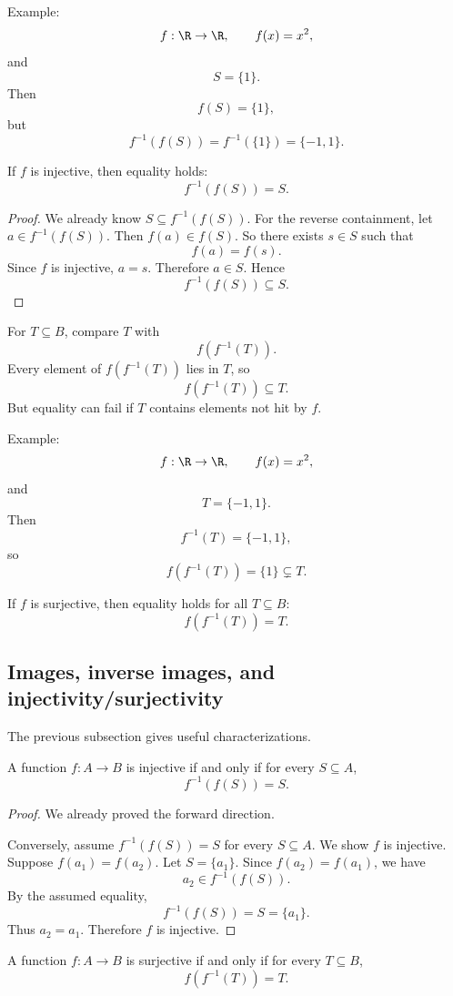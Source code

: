 Example:
\[
f:\R\to\R,\qquad f(x)=x^2,
\]
and
\[
S=\{1\}.
\]
Then
\[
f(S)=\{1\},
\]
but
\[
f^{-1}(f(S))=f^{-1}(\{1\})=\{-1,1\}.
\]

If $f$ is injective, then equality holds:
\[
f^{-1}(f(S))=S.
\]

\begin{proof}
We already know $S\subseteq f^{-1}(f(S))$. For the reverse containment, let $a\in f^{-1}(f(S))$. Then $f(a)\in f(S)$. So there exists $s\in S$ such that
\[
f(a)=f(s).
\]
Since $f$ is injective, $a=s$. Therefore $a\in S$. Hence
\[
f^{-1}(f(S))\subseteq S.
\]
\end{proof}

For $T\subseteq B$, compare $T$ with
\[
f(f^{-1}(T)).
\]
Every element of $f(f^{-1}(T))$ lies in $T$, so
\[
f(f^{-1}(T))\subseteq T.
\]
But equality can fail if $T$ contains elements not hit by $f$.

Example:
\[
f:\R\to\R,\qquad f(x)=x^2,
\]
and
\[
T=\{-1,1\}.
\]
Then
\[
f^{-1}(T)=\{-1,1\},
\]
so
\[
f(f^{-1}(T))=\{1\}\subsetneq T.
\]

If $f$ is surjective, then equality holds for all $T\subseteq B$:
\[
f(f^{-1}(T))=T.
\]

\subsection{Images, inverse images, and injectivity/surjectivity}

The previous subsection gives useful characterizations.

\begin{theorem}
A function $f:A\to B$ is injective if and only if for every $S\subseteq A$,
\[
f^{-1}(f(S))=S.
\]
\end{theorem}

\begin{proof}
We already proved the forward direction.

Conversely, assume $f^{-1}(f(S))=S$ for every $S\subseteq A$. We show $f$ is injective. Suppose $f(a_1)=f(a_2)$. Let $S=\{a_1\}$. Since $f(a_2)=f(a_1)$, we have
\[
a_2\in f^{-1}(f(S)).
\]
By the assumed equality,
\[
f^{-1}(f(S))=S=\{a_1\}.
\]
Thus $a_2=a_1$. Therefore $f$ is injective.
\end{proof}

\begin{theorem}
A function $f:A\to B$ is surjective if and only if for every $T\subseteq B$,
\[
f(f^{-1}(T))=T.
\]
\end{theorem}

